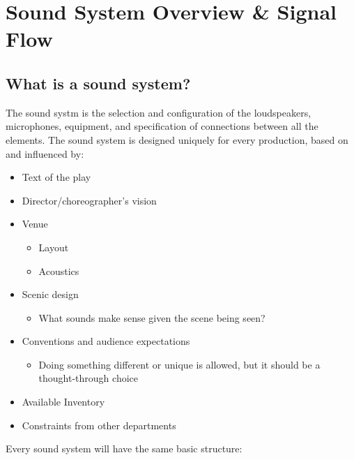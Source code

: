 \documentclass[a4paper]{article}
\begin{document}
\maketitle

\tableofcontents

\section{Sound System Overview \& Signal Flow}

\subsection{What is a sound system?}
The sound systm is the selection and configuration of the loudspeakers,
microphones, equipment, and specification of connections between all the
elements. The sound system is designed uniquely for every production, based on
and influenced by:
\begin{itemize}
	\item Text of the play
	\item Director/choreographer's vision
	\item Venue
		\begin{itemize}
			\item Layout
			\item Acoustics
		\end{itemize}
	\item Scenic design
		\begin{itemize}
			\item What sounds make sense given the scene being
				seen?
		\end{itemize}
	\item Conventions and audience expectations
		\begin{itemize}
			\item Doing something different or unique is allowed,
				but it should be a thought-through choice
		\end{itemize}
	\item Available Inventory
	\item Constraints from other departments
\end{itemize}
Every sound system will have the same basic structure:
\end{document}
